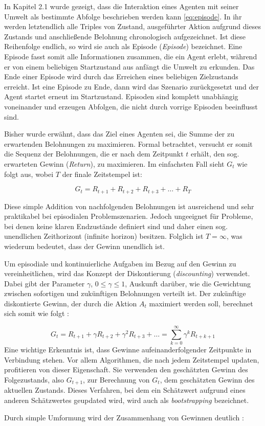 In Kapitel 2.1 wurde gezeigt, dass die Interaktion eines Agenten mit seiner Umwelt als bestimmte Abfolge beschrieben werden kann \eqref{eq:episode}. In ihr werden letztendlich alle Triples von Zustand, ausgeführter Aktion aufgrund dieses Zustands und anschließende Belohnung chronologisch aufgezeichnet. Ist diese Reihenfolge endlich, so wird sie auch als Episode (\textit{Episode}) bezeichnet. Eine Episode fasst somit alle Informationen zusammen, die ein Agent erlebt, während er von einem beliebigen Startzustand aus anfängt die Umwelt zu erkunden. Das Ende einer Episode wird durch das Erreichen eines beliebigen Zielzustands erreicht. Ist eine Episode zu Ende, dann wird das Szenario zurückgesetzt und der Agent startet erneut im Startzustand. Episoden sind komplett unabhängig voneinander und erzeugen Abfolgen, die nicht durch vorrige Episoden beeinflusst sind.
\par
Bisher wurde erwähnt, dass das Ziel eines Agenten sei, die Summe der zu erwartenden Belohnungen zu maximieren. Formal betrachtet, versucht er somit die Sequenz der Belohnungen, die er nach dem Zeitpunkt $t$ erhält, den sog. erwarteten Gewinn (\textit{Return}), zu maximieren. Im einfachsten Fall sieht $G_t$ wie folgt aus, wobei $T$ der finale Zeitstempel ist: \cite[S.55]{Sutton1998}

\begin{equation}\label{eq:simpleReturn}
    G_t = R_{t+1} + R_{t+2} + R_{t+3} + \dots + R_{T}
\end{equation}

Diese simple Addition von nachfolgenden Belohnungen ist ausreichend und sehr praktikabel bei episodialen Problemszenarien. Jedoch ungeeignet für Probleme, bei denen keine klaren Endzustände definiert sind und daher einen sog. unendlichen Zeithorizont (infinite horizon) besitzen. Folglich ist  $T=\infty$, was wiederum bedeutet, dass der Gewinn unendlich ist. 
\par 
Um episodiale und kontinuierliche Aufgaben im Bezug auf den Gewinn zu vereinheitlichen, wird das Konzept der Diskontierung (\textit{discounting}) verwendet. Dabei gibt der Parameter $\gamma$, $0\leq \gamma \leq 1$, Auskunft darüber, wie die Gewichtung zwischen sofortigen und zukünftigen Belohnungen verteilt ist. Der zukünftige diskontierte Gewinn, der durch die Aktion $A_t$ maximiert werden soll, berechnet sich somit wie folgt \cite[S.55]{Sutton1998}:

\begin{equation}\label{eq:discountedReturn}
    G_t = R_{t+1} + \gamma R_{t+2} + \gamma^2 R_{t+3} + \dots  = \sum_{k=0}^\infty{\gamma^k R_{t+k+1}}
\end{equation}
Eine wichtige Erkenntnis ist, dass Gewinne aufeinanderfolgender Zeitpunkte in Verbindung stehen. Vor allem Algorithmen, die nach jedem Zeitstempel updaten, profitieren von dieser Eigenschaft. Sie verwenden den geschätzten Gewinn des Folgezustands, also $G_{t+1}$, zur Berechnung von $G_t$, dem geschätzten Gewinn des aktuellen Zustands. Dieses Verfahren, bei dem ein Schätzwert aufgrund eines anderen Schätzwertes geupdated wird, wird auch als \textit{bootstrapping} bezeichnet.  
\par 
Durch simple Umformung wird der Zusammenhang von Gewinnen deutlich \cite[S.55]{Sutton1998}:

